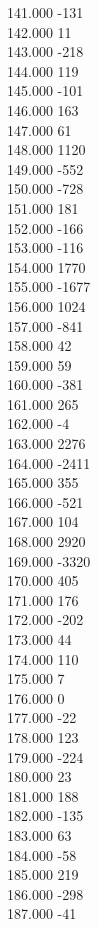 { 141.000	-131 \\
 142.000	11 \\
 143.000	-218 \\
 144.000	119 \\
 145.000	-101 \\
 146.000	163 \\
 147.000	61 \\
 148.000	1120 \\
 149.000	-552 \\
 150.000	-728 \\
 151.000	181 \\
 152.000	-166 \\
 153.000	-116 \\
 154.000	1770 \\
 155.000	-1677 \\
 156.000	1024 \\
 157.000	-841 \\
 158.000	42 \\
 159.000	59 \\
 160.000	-381 \\
 161.000	265 \\
 162.000	-4 \\
 163.000	2276 \\
 164.000	-2411 \\
 165.000	355 \\
 166.000	-521 \\
 167.000	104 \\
 168.000	2920 \\
 169.000	-3320 \\
 170.000	405 \\
 171.000	176 \\
 172.000	-202 \\
 173.000	44 \\
 174.000	110 \\
 175.000	7 \\
 176.000	0 \\
 177.000	-22 \\
 178.000	123 \\
 179.000	-224 \\
 180.000	23 \\
 181.000	188 \\
 182.000	-135 \\
 183.000	63 \\
 184.000	-58 \\
 185.000	219 \\
 186.000	-298 \\
 187.000	-41 \\
}
